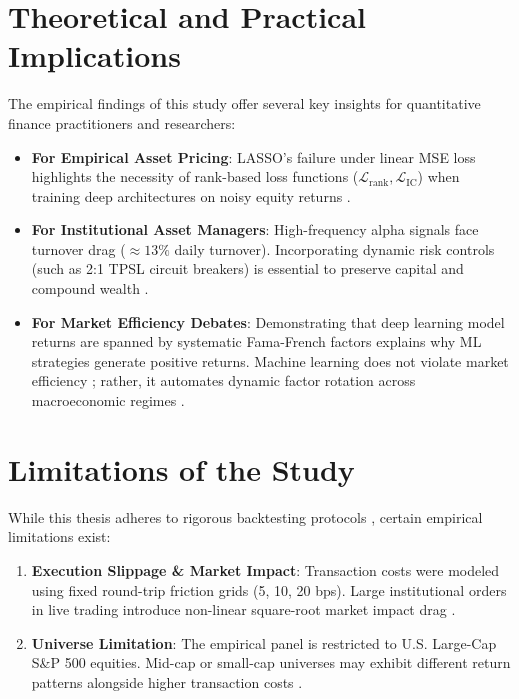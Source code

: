 \section{Theoretical and Practical Implications}
The empirical findings of this study offer several key insights for quantitative finance practitioners and researchers:

\begin{itemize}
    \item \textbf{For Empirical Asset Pricing}: LASSO's failure under linear MSE loss highlights the necessity of rank-based loss functions ($\mathcal{L}_{\text{rank}}, \mathcal{L}_{\operatorname{IC}}$) when training deep architectures on noisy equity returns \citep{tibshirani1996regression, kozak2020shrinking, gu2020empirical}.
    \item \textbf{For Institutional Asset Managers}: High-frequency alpha signals face turnover drag ($\approx 13\%$ daily turnover). Incorporating dynamic risk controls (such as 2:1 TPSL circuit breakers) is essential to preserve capital and compound wealth \citep{novy2016taxonomy, frazzini2014betting}.
    \item \textbf{For Market Efficiency Debates}: Demonstrating that deep learning model returns are spanned by systematic Fama-French factors explains why ML strategies generate positive returns. Machine learning does not violate market efficiency \citep{fama1970efficient}; rather, it automates dynamic factor rotation across macroeconomic regimes \citep{kelly2019characteristics, chen2023deep}.
\end{itemize}

\section{Limitations of the Study}
While this thesis adheres to rigorous backtesting protocols \citep{lopez2018advances}, certain empirical limitations exist:
\begin{enumerate}
    \item \textbf{Execution Slippage \& Market Impact}: Transaction costs were modeled using fixed round-trip friction grids (5, 10, 20 bps). Large institutional orders in live trading introduce non-linear square-root market impact drag \citep{novy2016taxonomy}.
    \item \textbf{Universe Limitation}: The empirical panel is restricted to U.S. Large-Cap S\&P 500 equities. Mid-cap or small-cap universes may exhibit different return patterns alongside higher transaction costs \citep{avramov2023machine, hou2020replicating}.
\end{enumerate}

